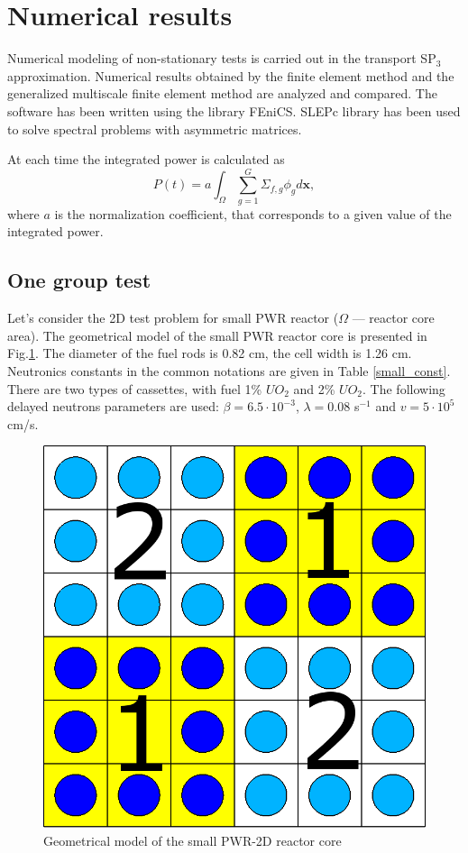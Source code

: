 \documentclass[preprint]{elsarticle}
\begin{document}
\section{Numerical results}
Numerical modeling of non-stationary tests is carried out in the transport SP$_3$ approximation.
Numerical results obtained by the finite element method and the generalized multiscale finite element method are analyzed and compared.
The software has been written using the library FEniCS.
SLEPc library has been used to solve spectral problems with asymmetric matrices.

At each time the integrated power is calculated as
	\[P(t) = a \int_{\Omega} \sum_{g=1}^{G} \Sigma_{f,g} \phi_g d \bm x,\]
where $a$ is the normalization coefficient, that corresponds to a given value of the integrated power.

\subsection{One group test} %
Let's consider the 2D test problem for small PWR reactor ($\Omega$ --- reactor core area). 
The geometrical model of the small PWR reactor core is presented in Fig.\ref{smallpwr}. 
The diameter of the fuel rods is 0.82 cm, the cell width is 1.26 cm.
Neutronics constants in the common notations are given in Table \ref{small_const}. 
There are two types of cassettes, with fuel 1\% $UO_2$ and 2\% $UO_2$.
The following delayed neutrons parameters are used: $\beta = 6.5 \cdot 10^{-3}$, $\lambda = 0.08$ s$^{-1}$ and $v = 5 \cdot 10^5$ cm/s.

\begin{figure}[ht]
	\centering
	    \includegraphics[width=0.45\linewidth] {small/smallpwr_geo.png}
	\caption{Geometrical model of the small PWR-2D reactor core}
	\label{smallpwr}
\end{figure} 
\end{document}
